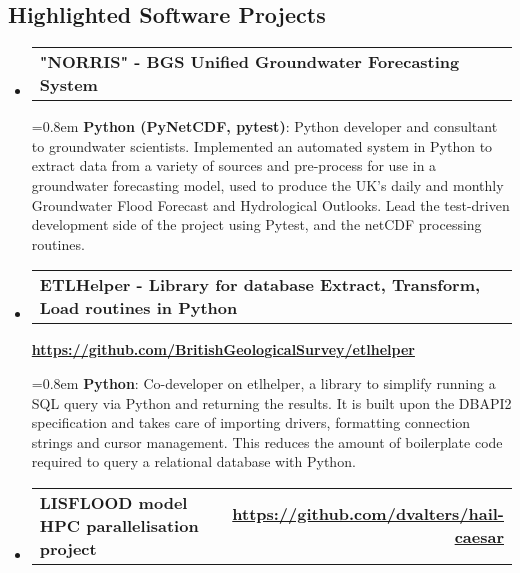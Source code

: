 \documentclass[10.5pt,a4]{article}
\makeatletter
\newcommand{\headerrow}[2]
{\begin{tabular*}{\linewidth}{l@{\extracolsep{\fill}}r}
	#1 &
	#2 \\
\end{tabular*}}
\makeatother
\begin{document}
\subsection*{Highlighted Software Projects}
\begin{itemize}
	\parskip=0.1em


%

%

\item
\headerrow
		{\textbf{"NORRIS" - BGS Unified Groundwater Forecasting System}}
		{}

		\parskip=0.8em
		\textbf{Python (PyNetCDF, pytest)}: Python developer and consultant to groundwater scientists. Implemented an automated system in Python to extract data from a variety of sources and pre-process for use in a groundwater forecasting model, used to produce the UK's daily and monthly Groundwater Flood Forecast and Hydrological Outlooks. Lead the test-driven development side of the project using Pytest, and the netCDF processing routines.

\item
\headerrow
		{\textbf{ETLHelper - Library for database Extract, Transform, Load routines in Python}}
		{}
		{\textbf{\url{https://github.com/BritishGeologicalSurvey/etlhelper}}}

		\parskip=0.8em
		\textbf{Python}: Co-developer on etlhelper, a library to simplify running a SQL query via Python and returning the results. It is built upon the DBAPI2 specification and takes care of importing drivers, formatting connection strings and cursor management. This reduces the amount of boilerplate code required to query a relational database with Python.
		
\item
\headerrow
		{\textbf{LISFLOOD model HPC parallelisation project}}
		{\textbf{\url{https://github.com/dvalters/hail-caesar}}}


\end{itemize}
\end{document}
